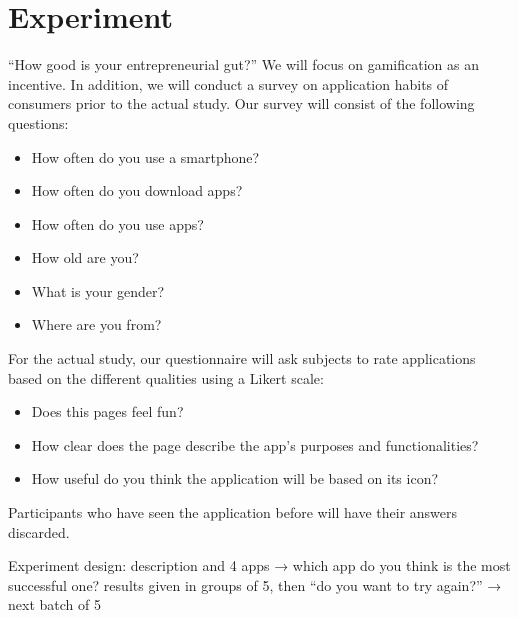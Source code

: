 \section{Experiment}

“How good is your entrepreneurial gut?”  We will focus on gamification as an incentive. In addition, we will conduct a survey on application habits of consumers prior to the actual study.  Our survey will consist of the following questions:

\begin{itemize}
\item How often do you use a smartphone?
\item How often do you download apps?
\item How often do you use apps?
\item How old are you?
\item What is your gender?
\item Where are you from?
\end{itemize}

For the actual study, our questionnaire will ask subjects to rate applications based on the different qualities using a Likert scale:

\begin{itemize}
\item Does this pages feel fun?
\item How clear does the page describe the app’s purposes and functionalities?
\item How useful do you think the application will be based on its icon?
\end{itemize}

Participants who have seen the application before will have their answers discarded.  

Experiment design: description and 4 apps → which app do you think is the most successful one?
results given in groups of 5, then “do you want to try again?” → next batch of 5



